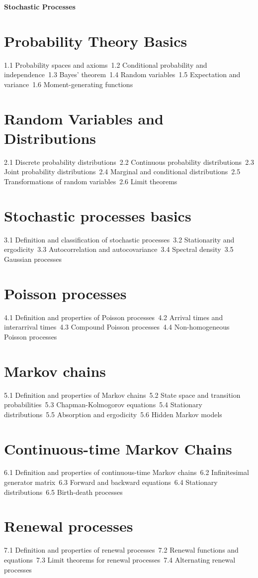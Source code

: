 {\LARGE \bf{Stochastic Processes}}
\section{Probability Theory Basics}
1.1 Probability spaces and axioms\
1.2 Conditional probability and independence\
1.3 Bayes' theorem\
1.4 Random variables\
1.5 Expectation and variance\
1.6 Moment-generating functions\
\section{Random Variables and Distributions}
2.1 Discrete probability distributions\
2.2 Continuous probability distributions\
2.3 Joint probability distributions\
2.4 Marginal and conditional distributions\
2.5 Transformations of random variables\
2.6 Limit theorems\
\section{Stochastic processes basics}
3.1 Definition and classification of stochastic processes\
3.2 Stationarity and ergodicity\
3.3 Autocorrelation and autocovariance\
3.4 Spectral density\
3.5 Gaussian processes\
\section{Poisson processes}
4.1 Definition and properties of Poisson processes\
4.2 Arrival times and interarrival times\
4.3 Compound Poisson processes\
4.4 Non-homogeneous Poisson processes\
\section{Markov chains}
5.1 Definition and properties of Markov chains\
5.2 State space and transition probabilities\
5.3 Chapman-Kolmogorov equations\
5.4 Stationary distributions\
5.5 Absorption and ergodicity\
5.6 Hidden Markov models\
\section{Continuous-time Markov Chains}
6.1 Definition and properties of continuous-time Markov chains\
6.2 Infinitesimal generator matrix\
6.3 Forward and backward equations\
6.4 Stationary distributions\
6.5 Birth-death processes\
\section{Renewal processes}
7.1 Definition and properties of renewal processes\
7.2 Renewal functions and equations\
7.3 Limit theorems for renewal processes\
7.4 Alternating renewal processes\
